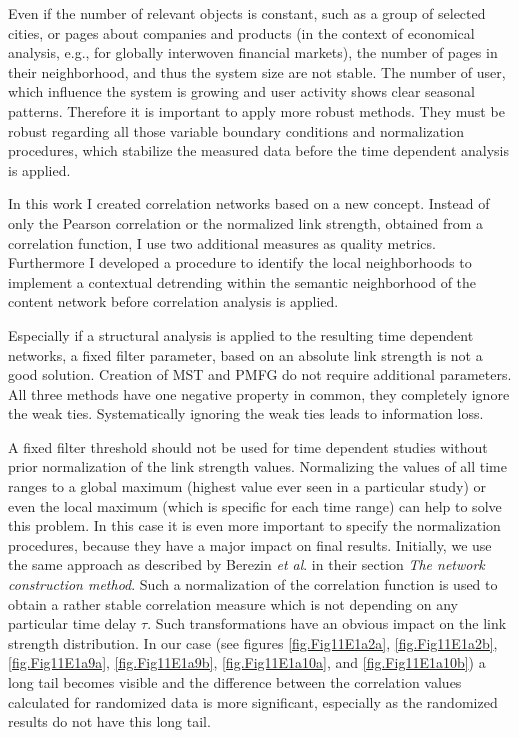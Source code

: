 \documentclass[a4paper,10pt]{scrbook}
\begin{document}
Even if the number of relevant objects is constant, such as a group of selected cities, or pages about companies and products (in the context of economical analysis, e.g., for globally interwoven financial markets), the number of pages in their neighborhood, and thus the system size are not stable. The number of user, which influence the system is growing and user activity shows clear seasonal patterns. Therefore it is important to apply more robust methods. They must be robust regarding all those variable boundary conditions and normalization procedures, which stabilize the measured data before the time dependent analysis is applied.

In this work I created correlation networks based on a new concept. Instead of only the Pearson correlation or the normalized link strength, obtained from a correlation function, I use two additional measures as quality metrics. Furthermore I developed a procedure to identify the local neighborhoods to implement a contextual detrending within the semantic neighborhood of the content network before correlation analysis is applied.

Especially if a structural analysis is applied to the resulting time dependent networks, a fixed filter parameter, based on an absolute link strength is not a good solution. 
Creation of MST and PMFG do not require additional parameters. All three methods have one negative property in common, they completely ignore the weak ties. Systematically ignoring the weak ties leads to information loss. 

A fixed filter threshold should not be used for time dependent studies without prior normalization of the link strength values. Normalizing the values of all time ranges to a global maximum (highest value ever seen in a particular study) or even the local maximum (which is specific for each time range) can help to solve this problem. In this case it is even more important to specify the normalization procedures, because they have a major impact on final results. Initially, we use the same approach as described by Berezin \textit{et al}. \cite{Berezin2011} in their section \textit{The network construction method}. Such a normalization of the correlation function is used to obtain a rather stable correlation measure which is not depending on any particular time delay $\tau$. Such transformations have an obvious impact on the link strength distribution. In our case (see figures \ref{fig.Fig11E1a2a}, \ref{fig.Fig11E1a2b}, \ref{fig.Fig11E1a9a}, \ref{fig.Fig11E1a9b}, \ref{fig.Fig11E1a10a}, and \ref{fig.Fig11E1a10b}) a long tail becomes visible and the difference between the correlation values calculated for randomized data is more significant, especially as the randomized results do not have this long tail. 
\end{document}
